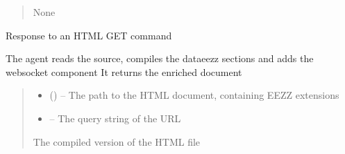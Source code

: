 \documentclass[letterpaper,10pt,english]{sphinxmanual}
\begin{document}
\begin{savenotes}
\begin{fulllineitems}
\begin{savenotes}
\begin{fulllineitems}
\begin{quote}
\begin{description}
\begin{itemize}
\end{itemize}

\sphinxAtStartPar
None

\end{description}\end{quote}

\end{fulllineitems}\end{savenotes}


\begin{savenotes}\begin{fulllineitems}
\label{\detokenize{eezz:eezz.http_agent.THttpAgent.do_get}}
\pysigstartsignatures
{}
\pysigstopsignatures
\sphinxAtStartPar
Response to an HTML GET command

\sphinxAtStartPar
The agent reads the source, compiles the data\sphinxhyphen{}eezz sections and adds the web\sphinxhyphen{}socket component
It returns the enriched document
\begin{quote}\begin{description}
\begin{itemize}
\item {} 
\sphinxAtStartPar
{} () – The path to the HTML document, containing EEZZ extensions

\item {} 
\sphinxAtStartPar
{} – The query string of the URL

\end{itemize}

\sphinxAtStartPar
The compiled version of the HTML file

\end{description}\end{quote}

\end{fulllineitems}\end{savenotes}


\end{fulllineitems}
\end{savenotes}
\end{document}
